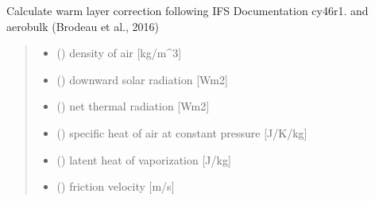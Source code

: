 \documentclass[letterpaper,10pt,english]{sphinxmanual}
\begin{document}
\begin{fulllineitems}
\label{\detokenize{users_guide:AirSeaFluxCode.cs_wl_subs.wl_ecmwf}}
\pysigstartsignatures
{}
\pysigstopsignatures
\sphinxAtStartPar
Calculate warm layer correction following IFS Documentation cy46r1.
and aerobulk (Brodeau et al., 2016)
\begin{quote}\begin{description}
\begin{itemize}
\item {} 
\sphinxAtStartPar
{} () \textendash{} density of air               {[}kg/m\textasciicircum{}3{]}

\item {} 
\sphinxAtStartPar
{} () \textendash{} downward solar radiation    {[}Wm\sphinxhyphen{}2{]}

\item {} 
\sphinxAtStartPar
{} () \textendash{} net thermal radiation  {[}Wm\sphinxhyphen{}2{]}

\item {} 
\sphinxAtStartPar
{} () \textendash{} specific heat of air at constant pressure {[}J/K/kg{]}

\item {} 
\sphinxAtStartPar
{} () \textendash{} latent heat of vaporization   {[}J/kg{]}

\item {} 
\sphinxAtStartPar
{} () \textendash{} friction velocity           {[}m/s{]}


\end{itemize}
\end{description}
\end{quote}
\end{fulllineitems}
\end{document}
